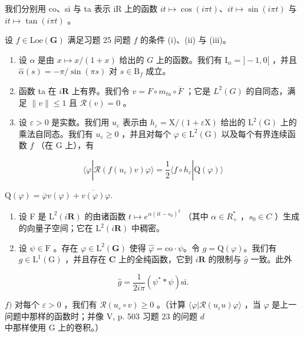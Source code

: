 我们分别用 co、si 与 ta 表示 iR 上的函数 \(it \mapsto \cos(i\pi t)\)、\(it \mapsto \sin(i\pi t)\) 与 \(it \mapsto \tan(i\pi t)\) 。

设 \(f \in \text{Loe}(\mathbf{G})\) 满足习题 25 问题 \(f\) 的条件 (i)、(ii) 与 (iii)。

\begin{enumerate}
\def\labelenumi{\alph{enumi})}
\item
  设 \(\alpha\) 是由 \(x \mapsto x / (1 + x)\) 给出的 \(G\) 上的函数。我们有 \(\mathrm{I}_{\alpha} = ] - 1,0[\) ，并且 \(\widehat{\alpha}(s) = -\pi / \sin(\pi s)\) 对 \(s \in \mathrm{B}_f\) 成立。
\item
  函数 ta 在 \(i\mathbf{R}\) 上有界。我们令 \(v = F \circ m_{ta} \circ \overline{F}\) ；它是 \(L^{2}(G)\) 的自同态，满足 \(\|v\| \leqslant 1\) 且 \(\mathcal{R}(v) = 0\) 。
\item
  设 \(\varepsilon > 0\) 是实数。我们用 \(u_{\varepsilon}\) 表示由 \(h_{\varepsilon} = \mathrm{X}/(1 + \varepsilon\mathrm{X})\) 给出的 \(\mathrm{L}^2(\mathrm{G})\) 上的乘法自同态。我们有 \(u_{\varepsilon} \geqslant 0\) ，并且对每个 \(\varphi \in \mathrm{L}^2(\mathrm{G})\) 以及每个有界连续函数 \(f\) （在 \(\mathrm{G}\) 上），有
\end{enumerate}

\[
\langle \varphi | \mathcal {R} (f (u _ {\varepsilon}) v) \varphi \rangle = \frac {1}{2} \langle f \circ h _ {\varepsilon} | \mathrm{Q} (\varphi) \rangle
\]

\(\mathrm{Q}(\varphi) = \overline{\varphi} v(\varphi) + \overline{v(\varphi)}\varphi .\)

\begin{enumerate}
\def\labelenumi{\alph{enumi})}
\setcounter{enumi}{3}
\item
  设 F 是 \(\mathrm{L}^{2}(i\mathbf{R})\) 的由诸函数 \(t \mapsto e^{\alpha(it - s_{0})^{2}}\) （其中 \(\alpha \in R_{+}^{*}\) ，\(s_{0} \in C\) ）生成的向量子空间；它在 \(\mathrm{L}^{2}(i\mathbf{R})\) 中稠密。
\item
  设 \(\psi \in \mathrm{F}\) 。存在 \(\varphi \in \mathrm{L}^2 (\mathbf{G})\) 使得 \(\widehat{\varphi} = \mathrm{co}\cdot \psi\)。令 \(g = \mathrm{Q}(\varphi)\)。我们有 \(g\in \mathrm{L}^{1}(\mathrm{G})\) ，并且存在 \(\mathbf{C}\) 上的全纯函数，它到 \(i\mathbf{R}\) 的限制与 \(\widehat{g}\) 一致。此外
\end{enumerate}

\[
\widehat {g} = \frac {1}{2 i \pi} (\psi^ {*} * \psi) \mathrm{si}.
\]

\(f)\) 对每个 \(\varepsilon > 0\) ，我们有 \(\mathcal{R}(u_{\varepsilon} \circ v) \geqslant 0\) 。（计算 \(\langle \varphi | \mathcal{R}(u_{\varepsilon} u) \varphi \rangle\) ，当 \(\varphi\) 是上一问题中那样的函数时；并像 V, p. 503 习题 23 的问题 \(d\) 中那样使用 G 上的卷积。）

